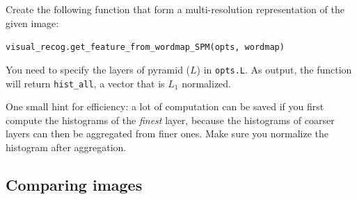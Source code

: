 \documentclass[10pt]{article}
\makeatletter
\DeclareRobustCommand\onedot{\futurelet\@let@token\@onedot}
\def\@onedot{\ifx\@let@token.\else.\null\fi\xspace}
\def\ie{\emph{i.e}\onedot} \def\Ie{\emph{I.e}\onedot}
\makeatother
\begin{document}
\par {}
Create the following function that form a multi-resolution representation of the given image:

\begin{center}
{\tt visual\_recog.get\_feature\_from\_wordmap\_SPM(opts, wordmap)}
\end{center}
You need to specify the layers of pyramid ($L$) in {\tt opts.L}. 
As output, the function will return {\tt hist\_all}, a vector that is $L_1$ normalized. 

One small hint for efficiency: a lot of computation can be saved if you first compute the histograms of the {\it finest} layer, because the histograms of coarser layers can then be aggregated from finer ones. Make sure you normalize the histogram after aggregation.

\subsection{Comparing images}
\end{document}
